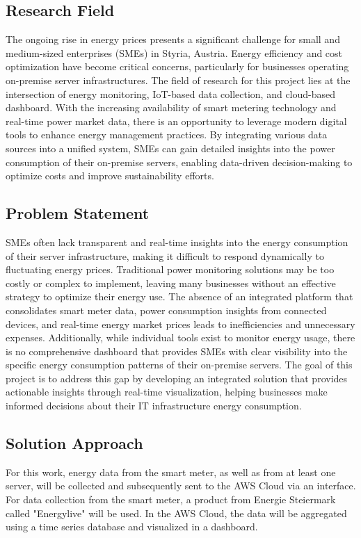 \subsection{Research Field}
The ongoing rise in energy prices presents a significant challenge for small and medium-sized enterprises (SMEs) in Styria, Austria. 
Energy efficiency and cost optimization have become critical concerns, particularly for businesses operating on-premise server infrastructures. 
The field of research for this project lies at the intersection of energy monitoring, IoT-based data collection, and cloud-based dashboard. 
With the increasing availability of smart metering technology and real-time power market data, there is an opportunity to leverage modern digital tools to enhance energy management practices. 
By integrating various data sources into a unified system, SMEs can gain detailed insights into the power consumption of their on-premise servers, enabling data-driven decision-making to optimize costs and improve sustainability efforts.

\subsection{Problem Statement}

SMEs often lack transparent and real-time insights into the energy consumption of their server infrastructure, making it difficult to respond dynamically to fluctuating energy prices. 
Traditional power monitoring solutions may be too costly or complex to implement, leaving many businesses without an effective strategy to optimize their energy use. 
The absence of an integrated platform that consolidates smart meter data, power consumption insights from connected devices, and real-time energy market prices leads to inefficiencies and unnecessary expenses. 
Additionally, while individual tools exist to monitor energy usage, there is no comprehensive dashboard that provides SMEs with clear visibility into the specific energy consumption patterns of their on-premise servers. 
The goal of this project is to address this gap by developing an integrated solution that provides actionable insights through real-time visualization, helping businesses make informed decisions about their IT infrastructure energy consumption.

\subsection{Solution Approach}
For this work, energy data from the smart meter, as well as from at least one server, will be collected and subsequently sent to the AWS Cloud via an interface.
For data collection from the smart meter, a product from Energie Steiermark called "Energylive" will be used.
In the AWS Cloud, the data will be aggregated using a time series database and visualized in a dashboard.
